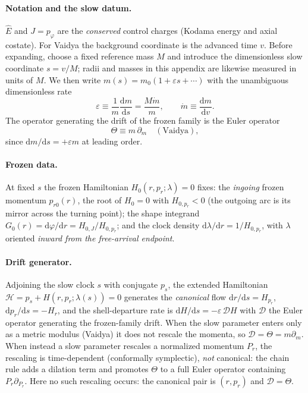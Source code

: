 \documentclass[12pt]{iopart}
\newcommand{\Ehat}{\hat E}
\newcommand{\dd}{\mathrm{d}}
\begin{document}
\paragraph{Notation and the slow datum.} $\Ehat$ and $J=p_\varphi$ are the
\emph{conserved} control charges (Kodama energy and axial costate). For Vaidya the
background coordinate is the advanced time $v$. Before expanding, choose a fixed
reference mass $M$ and introduce the dimensionless slow coordinate $s=v/M$; radii and
masses in this appendix are likewise measured in units of $M$. We then write
$m(s)=m_0(1+\varepsilon s+\cdots)$ with the unambiguous dimensionless rate
\[
    \varepsilon\equiv\frac{1}{m}\frac{\dd m}{\dd s}
    =\frac{M\dot m}{m},\qquad \dot m\equiv\frac{\dd m}{\dd v}.
\]
The operator generating the drift of the frozen family is the
Euler operator
\begin{equation}
    \Theta\equiv m\,\partial_m\quad(\text{Vaidya}),
    \label{eq:theta-op}
\end{equation}
since $\dd m/\dd s=+\varepsilon m$ at leading order.

\paragraph{Frozen data.} At fixed $s$ the frozen Hamiltonian $H_0(r,p_r;\lambda)=0$
fixes: the \emph{ingoing} frozen momentum $p_{r0}(r)$, the root of $H_0=0$ with
$H_{0,p_r}<0$ (the outgoing arc is its mirror across the turning point); the shape
integrand $G_0(r)=\dd\varphi/\dd r=H_{0,J}/H_{0,p_r}$; and the clock density
$\dd\lambda/\dd r=1/H_{0,p_r}$, with $\lambda$ oriented \emph{inward from the
free-arrival endpoint}.

\paragraph{Drift generator.} Adjoining the slow clock $s$ with conjugate $p_s$, the
extended Hamiltonian $\mathcal H=p_s+H(r,p_r;\lambda(s))=0$ generates the \emph{canonical}
flow $\dd r/\dd s=H_{p_r}$, $\dd p_r/\dd s=-H_r$, and the shell-departure rate is
$\dd H/\dd s=-\varepsilon\,\mathcal D H$ with $\mathcal D$ the Euler operator generating
the frozen-family drift. When the slow parameter enters only as a metric modulus
(Vaidya) it does not rescale the momenta, so $\mathcal D=\Theta=m\partial_m$. When
instead a slow parameter rescales a normalized momentum $P_r$, the rescaling is
time-dependent (conformally symplectic), \emph{not} canonical: the chain rule adds a
dilation term and promotes $\Theta$ to a full Euler operator containing
$P_r\partial_{P_r}$. Here no such rescaling occurs: the canonical pair is $(r,p_r)$ and
$\mathcal D=\Theta$.
\end{document}
